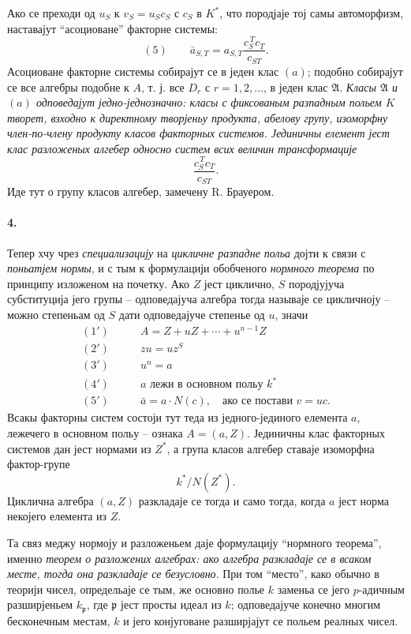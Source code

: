 ﻿\documentclass[11pt]{article}
\begin{document}
Ако се преходи од \(u_S\) к \(v_S=u_Sc_S\) с \(c_S\) в \(K^\ast\), что породјаје тој самы автоморфизм, наставајут ``асоциоване'' факторне системы:
\[
(5)\qquad \bar a_{S,T}=a_{S,T}\frac{c_S^{\,T}c_T}{c_{ST}}.
\]
Асоциоване факторне системы собирајут се в једен клас \((a)\); подобно собирајут се все алгебры подобне к \(A\), т. ј. все \(D_r\) с \(r=1,2,\ldots\), в једен клас \(\mathfrak A\). \emph{Класы \(\mathfrak A\) и \((a)\) одповедајут једно-једнозначно: класы с фиксованым разпадным польем \(K\) творет, взходно к директному творјеньу продукта, абелову групу, изоморфну член-по-члену продукту класов факторных системов. Јединичны елемент јест клас разложеных алгебер односно систем всих величин трансформације}
\[
        \frac{c_S^{\,T}c_T}{c_{ST}}.
\]
Иде тут о групу класов алгебер, замечену R. Брауером.

\paragraph{4.}
Тепер хчу чрез \emph{специализацију} на \emph{цикличне разпадне польа} дојти к связи с \emph{поньатјем нормы}, и с тым к формулацији обобченого \emph{нормного теорема} по принципу изложеном на почетку. Ако \(Z\) јест циклично, \(S\) породјујуча субституција јего групы -- одповедајуча алгебра тогда называје се цикличноју -- можно степеньам од \(S\) дати одповедајуче степенье од \(u\), значи
\[
\begin{aligned}
(1')\qquad &A=Z+uZ+\cdots+u^{n-1}Z\\
(2')\qquad &zu=uz^S\\
(3')\quad &u^n=a\\
(4')\quad &a\text{ лежи в основном польу }k^\ast\\
(5')\quad &\bar a=a\cdot N(c),\quad \text{ако се постави }v=uc.
\end{aligned}
\]
Всакы факторны систем состоји тут теда из једного-јединого елемента \(a\), лежечего в основном польу -- ознака \(A=(a,Z)\). Јединичны клас факторных системов дан јест нормами из \(Z^\ast\), а група класов алгебер ставаје изоморфна фактор-групе
\[
        k^\ast/N(Z^\ast).
\]
Циклична алгебра \((a,Z)\) разкладаје се тогда и само тогда, когда \(a\) јест норма некојего елемента из \(Z\).

Та связ меджу нормоју и разложеньем даје формулацију ``нормного теорема'', именно \emph{теорем о разложених алгебрах: ако алгебра разкладаје се в всаком месте, тогда она разкладаје се безусловно}. При том ``место'', како обычно в теорији чисел, определьаје се тым, же основно полье \(k\) заменьа се јего \(p\)-адичным разширјеньем \(k_{\mathfrak p}\), где \(\mathfrak p\) јест просты идеал из \(k\); одповедајуче конечно многим бесконечным местам, \(k\) и јего конјуговане разширјајут се польем реалных чисел.
\end{document}
